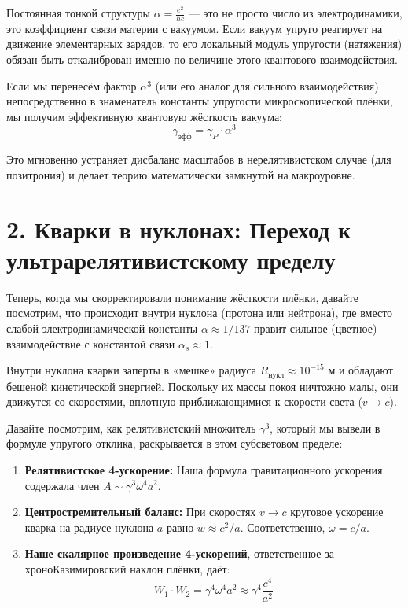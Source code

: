 \documentclass[12pt,a4paper]{article}
\begin{document}
Постоянная тонкой структуры $\alpha = \frac{e^2}{\hbar c}$ — это не просто число из электродинамики, это коэффициент связи материи с вакуумом. Если вакуум упруго реагирует на движение элементарных зарядов, то его локальный модуль упругости (натяжения) обязан быть откалиброван именно по величине этого квантового взаимодействия.

Если мы перенесём фактор $\alpha^3$ (или его аналог для сильного взаимодействия) непосредственно в знаменатель константы упругости микроскопической плёнки, мы получим эффективную квантовую жёсткость вакуума:
\begin{equation}
\gamma_{эфф} = \gamma_P \cdot \alpha^3
\end{equation}

Это мгновенно устраняет дисбаланс масштабов в нерелятивистском случае (для позитрония) и делает теорию математически замкнутой на макроуровне.

\section*{2. Кварки в нуклонах: Переход к ультрарелятивистскому пределу}

Теперь, когда мы скорректировали понимание жёсткости плёнки, давайте посмотрим, что происходит внутри нуклона (протона или нейтрона), где вместо слабой электродинамической константы $\alpha \approx 1/137$ правит сильное (цветное) взаимодействие с константой связи $\alpha_s \approx 1$.

Внутри нуклона кварки заперты в «мешке» радиуса $R_{нукл} \approx 10^{-15}$ м и обладают бешеной кинетической энергией. Поскольку их массы покоя ничтожно малы, они движутся со скоростями, вплотную приближающимися к скорости света ($v \rightarrow c$).

Давайте посмотрим, как релятивистский множитель $\gamma^3$, который мы вывели в формуле упругого отклика, раскрывается в этом субсветовом пределе:

\begin{enumerate}
    \item \textbf{Релятивистское 4-ускорение:} Наша формула гравитационного ускорения содержала член $A \sim \gamma^3 \omega^4 a^2$.
    \item \textbf{Центростремительный баланс:} При скоростях $v \rightarrow c$ круговое ускорение кварка на радиусе нуклона $a$ равно $w \approx c^2/a$. Соответственно, $\omega = c/a$.
    \item \textbf{Наше скалярное произведение 4-ускорений}, ответственное за хроноКазимировский наклон плёнки, даёт:
    \begin{equation}
    W_1 \cdot W_2 = \gamma^4 \omega^4 a^2 \approx \gamma^4 \frac{c^4}{a^2}
    \end{equation}
\end{enumerate}
\end{document}
